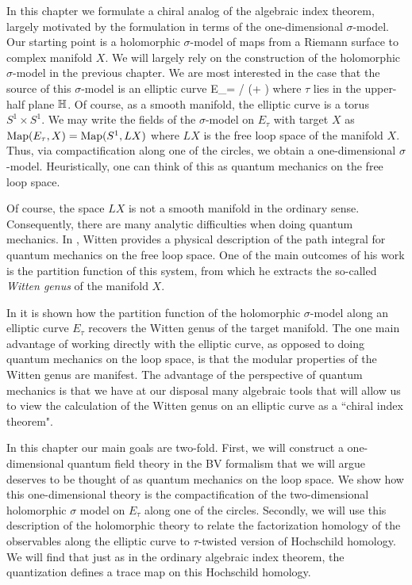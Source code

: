 \documentclass[10pt]{amsart}
\begin{document}
In this chapter we formulate a chiral analog of the algebraic index theorem, largely motivated by the formulation in terms of the one-dimensional $\sigma$-model.
Our starting point is a holomorphic $\sigma$-model of maps from a Riemann surface to complex manifold $X$.
We will largely rely on the construction of the holomorphic $\sigma$-model in the previous chapter.
We are most interested in the case that the source of this $\sigma$-model is an elliptic curve 
\ben
E_\tau = \CC / (\ZZ + \tau \ZZ)
\een
where $\tau$ lies in the upper-half plane $\mathbb H$. 
Of course, as a smooth manifold, the elliptic curve is a torus $S^1 \times S^1$. 
We may write the fields of the $\sigma$-model on $E_\tau$ with target $X$ as ${\rm Map}(E_\tau, X) = {\rm Map}(S^1, L X)$ where $LX$ is the free loop space of the manifold $X$.
Thus, via compactification along one of the circles, we obtain a one-dimensional $\sigma$-model. 
Heuristically, one can think of this as quantum mechanics on the free loop space. 

Of course, the space $LX$ is not a smooth manifold in the ordinary sense.
Consequently, there are many analytic difficulties when doing quantum mechanics. 
In \cite{WittenDirac}, Witten provides a physical description of the path integral for quantum mechanics on the free loop space.
One of the main outcomes of his work is the partition function of this system, from which he extracts the so-called {\em Witten genus} of the manifold $X$. 

In \cite{WG1,WG2, GGW} it is shown how the partition function of the holomorphic $\sigma$-model along an elliptic curve $E_\tau$ recovers the Witten genus of the target manifold. 
The one main advantage of working directly with the elliptic curve, as opposed to doing quantum mechanics on the loop space, is that the modular properties of the Witten genus are manifest. 
The advantage of the perspective of quantum mechanics is that we have at our disposal many algebraic tools that will allow us to view the calculation of the Witten genus on an elliptic curve as a ``chiral index theorem". 

In this chapter our main goals are two-fold. 
First, we will construct a one-dimensional quantum field theory in the BV formalism that we will argue deserves to be thought of as quantum mechanics on the loop space.
We show how this one-dimensional theory is the compactification of the two-dimensional holomorphic $\sigma$ model on $E_\tau$ along one of the circles. 
Secondly, we will use this description of the holomorphic theory to relate the factorization homology of the observables along the elliptic curve to $\tau$-twisted version of Hochschild homology.
We will find that just as in the ordinary algebraic index theorem, the quantization defines a trace map on this Hochschild homology. 
\end{document}
